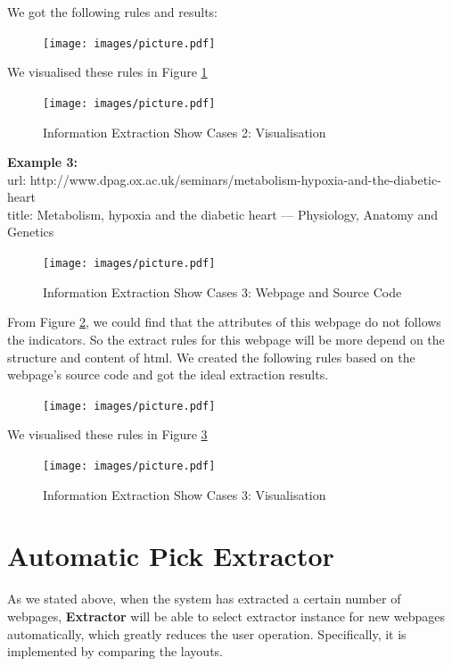 We got the following rules and results:
\begin{figure}[htbp!]
	\centering
	\texttt{[image: images/picture.pdf]}
\end{figure}

We visualised these rules in Figure \ref{fig:ie_case_2v}
\begin{figure}[H]
	\centering
	\texttt{[image: images/picture.pdf]}
	\caption{Information Extraction Show Cases 2: Visualisation}\label{fig:ie_case_2v}
\end{figure}

\pagebreak
\noindent \textbf{Example 3:}\\
url: http://www.dpag.ox.ac.uk/seminars/metabolism-hypoxia-and-the-diabetic-heart\\
title: Metabolism, hypoxia and the diabetic heart — Physiology, Anatomy and Genetics\\

\begin{figure}[htbp!]
	\centering
	\texttt{[image: images/picture.pdf]}
	\caption{Information Extraction Show Cases 3: Webpage and Source Code}\label{fig:ie_case_3b}
\end{figure}

From Figure \ref{fig:ie_case_3b}, we could find that the attributes of this webpage do not follows the indicators. So the extract rules for this webpage will be more depend on the structure and content of html. We created the following rules based on the webpage's source code and got the ideal extraction results.

\begin{figure}[htbp!]
	\centering
	\texttt{[image: images/picture.pdf]}
\end{figure}

We visualised these rules in Figure \ref{fig:ie_case_3v}
\begin{figure}[htbp!]
	\centering
	\texttt{[image: images/picture.pdf]}
	\caption{Information Extraction Show Cases 3: Visualisation}\label{fig:ie_case_3v}
\end{figure}

\pagebreak
\section{Automatic Pick Extractor}
As we stated above, when the system has extracted a certain number of webpages, \textbf{Extractor} will be able to select extractor instance for new webpages automatically, which greatly reduces the user operation. Specifically, it is implemented by comparing the layouts.

